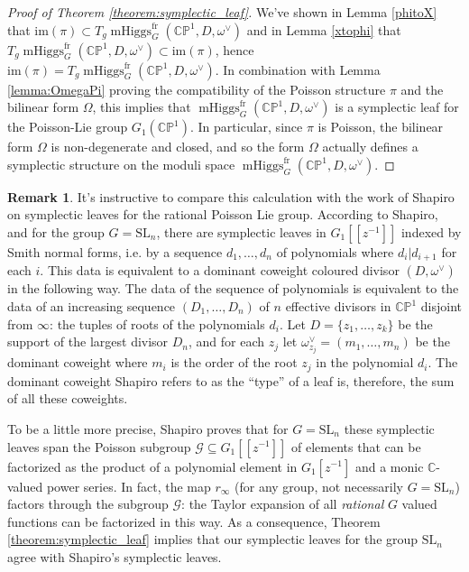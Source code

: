 \documentclass[11pt, oneside, reqno]{amsart}
\theoremstyle{definition} \newtheorem{definition}{Definition}[section]
\theoremstyle{definition} \newtheorem{remark}[definition]{Remark}
\theoremstyle{definition} \newtheorem{remarks}[definition]{Remarks}
\theoremstyle{definition} \newtheorem{question}[definition]{Question}
\theoremstyle{definition} \newtheorem*{note}{Note}
\theoremstyle{definition} \newtheorem{example}[definition]{Example}
\theoremstyle{definition} \newtheorem{examples}[definition]{Examples}
\newcommand{\bb}[1]{\mathbb{#1}}
\newcommand{\mr}[1]{\mathrm{#1}}
\newcommand{\mc}[1]{\mathcal{#1}}
\newcommand{\CC}{\mathbb{C}}
\newcommand{\SL}{\mathrm{SL}}
\newcommand{\sub}{\subseteq}
\DeclareMathOperator{\mhiggs}{mHiggs}
\newcommand{\fr}{\mathrm{fr}}
\begin{document}
\begin{proof}[Proof of Theorem \ref{theorem:symplectic_leaf}]
We've shown in Lemma \ref{phitoX} that $\mathrm{im}(\pi) \subset T_{g} \mhiggs^\fr_G(\bb{CP}^1, D, \omega^\vee)$ and in Lemma \ref{xtophi} that $T_{g} \mhiggs^\fr_G(\bb{CP}^1, D, \omega^\vee) \subset \mathrm{im}(\pi)$, hence $\mr{im}(\pi) = T_{g} \mhiggs^\fr_G(\bb{CP}^1, D, \omega^\vee)$. In combination with Lemma \ref{lemma:OmegaPi} proving the compatibility of the Poisson structure $\pi$ and the bilinear form $\Omega$, this implies that $\mhiggs^\fr_G(\bb{CP}^1, D, \omega^\vee)$ is
a symplectic leaf for the Poisson-Lie group $G_1(\bb{CP}^1)$. In particular, since $\pi$ is Poisson, the bilinear form $\Omega$ is non-degenerate and closed, and so the form $\Omega$ actually defines a symplectic structure on the moduli space $\mhiggs^\fr_G(\bb{CP}^1, D, \omega^\vee)$.
\end{proof}

\begin{remark} \label{shapiro_leaves_remark}
It's instructive to compare this calculation with the work of Shapiro \cite{Shapiro} on symplectic leaves for the rational Poisson Lie group.  According to Shapiro, and for the group $G = \SL_n$, there are symplectic leaves in $G_1[[z^{-1}]]$ indexed by Smith normal forms, i.e. by a sequence $d_1, \ldots, d_n$ of polynomials where $d_i | d_{i+1}$ for each $i$.  This data is equivalent to a dominant coweight coloured divisor $(D,\omega^\vee)$ in the following way.  The data of the sequence of polynomials is equivalent to the data of an increasing sequence $(D_1, \ldots, D_n)$ of $n$ effective divisors in $\bb{CP}^1$ disjoint from $\infty$: the tuples of roots of the polynomials $d_i$.  Let $D = \{z_1, \ldots, z_k\}$ be the support of the largest divisor $D_n$, and for each $z_j$ let $\omega^\vee_{z_j} = (m_1, \ldots, m_n)$ be the dominant coweight where $m_i$ is the order of the root $z_j$ in the polynomial $d_i$.  The dominant coweight Shapiro refers to as the ``type'' of a leaf is, therefore, the sum of all these coweights.

To be a little more precise, Shapiro proves that for $G = \SL_n$ these symplectic leaves span the Poisson subgroup $\mc G \sub G_1[[z^{-1}]]$ of elements that can be factorized as the product of a polynomial element in $G_1[z^{-1}]$ and a monic $\CC$-valued power series.  In fact, the map $r_\infty$ (for any group, not necessarily $G = \SL_n$) factors through the subgroup $\mc G$: the Taylor expansion of all \emph{rational} $G$ valued functions can be factorized in this way.  As a consequence, Theorem \ref{theorem:symplectic_leaf} implies that our symplectic leaves for the group $\SL_n$ agree with Shapiro's symplectic leaves.
\end{remark}
\end{document}
